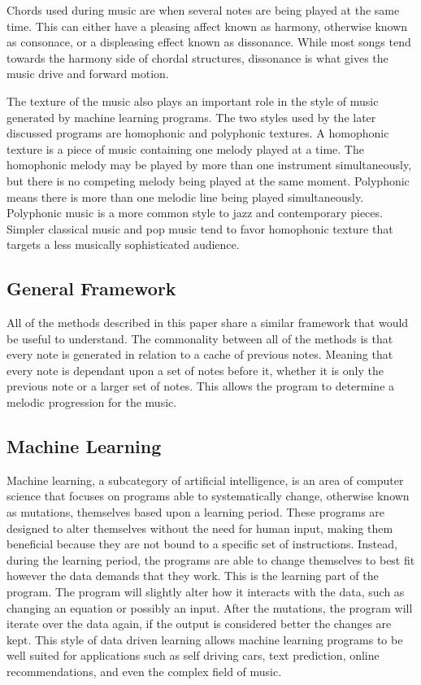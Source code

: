 \documentclass{sig-alternate}
\begin{document}
Chords used during music are when several notes are being played at the same time. This can either have a pleasing affect known as harmony, otherwise known as consonace, or a displeasing effect known as dissonance. While most songs tend towards the harmony side of chordal structures, dissonance is what gives the music drive and forward motion.

The texture of the music also plays an important role in the style of music generated by machine learning programs. The two styles used by the later discussed programs are homophonic and polyphonic textures. A homophonic texture is a piece of music containing one melody played at a time. The homophonic melody may be played by more than one instrument simultaneously, but there is no competing melody being played at the same moment. Polyphonic means there is more than one melodic line being played simultaneously. Polyphonic music is a more common style to jazz and contemporary pieces. Simpler classical music and pop music tend to favor homophonic texture that targets a less musically sophisticated audience.
\subsection{General Framework}
\label{sec:framework}
	All of the methods described in this paper share a similar framework that would be useful to understand. The commonality between all of the methods is that every note is generated in relation to a cache of previous notes. Meaning that every note is dependant upon a set of notes before it, whether it is only the previous note or a larger set of notes. This allows the program to determine a melodic progression for the music.

\subsection{Machine Learning}
\label{sec:machinelearning}
	Machine learning, a subcategory of artificial intelligence, is an area of computer science that focuses on programs able to systematically change, otherwise known as mutations, themselves based upon a learning period. These programs are designed to alter themselves without the need for human input, making them beneficial because they are not bound to a specific set of instructions. Instead, during the learning period, the programs are able to change themselves to best fit however the data demands that they work. This is the learning part of the program. The program will slightly alter how it interacts with the data, such as changing an equation or possibly an input. After the mutations, the program will iterate over the data again, if the output is considered better the changes are kept.  This style of data driven learning allows machine learning programs to be well suited for applications such as self driving cars, text prediction, online recommendations, and even the complex field of music.
\end{document}
